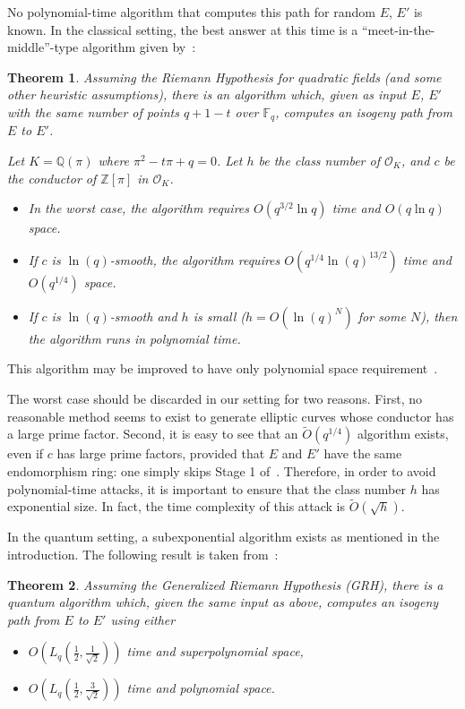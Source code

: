 \documentclass{article}
\newcommand{\F}{\mathbb{F}}
\newcommand{\Q}{\mathbb{Q}}
\newcommand{\Z}{\mathbb{Z}}
\renewcommand{\O}{\mathcal{O}}
\newcommand{\softO}{\tilde{O}}
\newtheorem{theorem}{Theorem}[section]
\theoremstyle{definition}
\begin{document}
No polynomial-time algorithm that computes this path for
random $E$, $E'$ is known. In the classical setting, the best
answer at this time is a ``meet-in-the-middle''-type algorithm
given by~\cite{Gal}:

\begin{theorem}
Assuming the Riemann Hypothesis for quadratic fields (and
some other heuristic assumptions),
there is an algorithm which, given as input $E$, $E'$ with the
same number of points $q+1-t$ over $\F_q$, computes an isogeny path
from $E$ to $E'$.

Let $K = \Q(\pi)$ where $\pi^2 - t \pi + q = 0$. Let $h$ be the
class number of $\O_K$, and $c$ be the conductor of $\Z[\pi]$ in
$\O_K$.
\begin{itemize}
\item[(a)] In the worst case, the algorithm requires $O(q^{3/2}\ln q)$
time and $O(q\ln q)$ space.
\item[(b)] If $c$ is $\ln(q)$-smooth, the algorithm requires
$O(q^{1/4}\ln(q)^{13/2})$ time and $O(q^{1/4})$ space.
\item[(c)] If $c$ is $\ln(q)$-smooth and $h$ is small
($h = O(\ln(q)^N)$ for some $N$), then the algorithm runs in
polynomial time.
\end{itemize}
\end{theorem}

This algorithm may be improved to have only polynomial space
requirement~\cite{GHS, galbraith+stolbunov11}.

The worst case should be discarded in our setting for two reasons.
First, no reasonable method seems to exist to generate elliptic curves
whose conductor has a large prime factor. Second, it is easy to see that
an $\softO(q^{1/4})$ algorithm exists, even if $c$ has large prime factors,
provided that $E$ and $E'$ have the same endomorphism ring: one simply
skips Stage 1 of~\cite{Gal}.
Therefore, in order to avoid polynomial-time attacks, it is important
to ensure that the class number $h$ has exponential size. In fact, the
time complexity of this attack is $\softO(\sqrt{h})$.


In the quantum setting, a subexponential algorithm exists as mentioned
in the introduction. The following result is taken
from~\cite{childs2014constructing}:

\begin{theorem}
Assuming the Generalized Riemann Hypothesis (GRH), there is
a quantum algorithm which, given the same input as above,
computes an isogeny path from $E$ to $E'$ using either
\begin{itemize}
\item $O(L_q(\frac{1}{2},\frac{1}{\sqrt{2}}))$ time and
superpolynomial space,
\item $O(L_q(\frac{1}{2},\frac{3}{\sqrt{2}}))$ time and
polynomial space.
\end{itemize}
\end{theorem}
\end{document}
